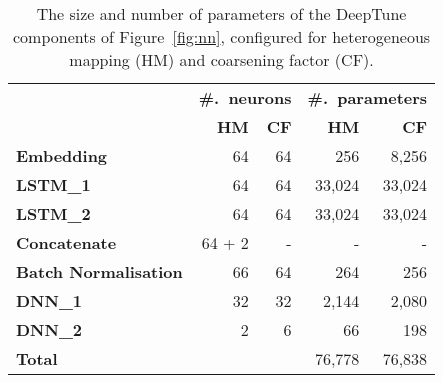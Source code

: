 \begin{table}
  \centering
  \begin{tabular}{| l r r | r r |}
    \hline
    \rowcolor{gray!50}
    & \multicolumn{2}{c}{\textbf{\#.\ neurons}} & \multicolumn{2}{c}{\textbf{\#.\ parameters}} \\
    \rowcolor{gray!50}
    & \textbf{HM} & \textbf{CF} & \textbf{HM} & \textbf{CF} \\
    \hline
    \textbf{Embedding} & 64 & 64 & 256 & 8,256 \\
    \textbf{LSTM\_1} & 64 & 64 & 33,024 & 33,024 \\
    \textbf{LSTM\_2} & 64 & 64 & 33,024 & 33,024 \\
    \textbf{Concatenate} & 64 + 2 & - & - & - \\
    \textbf{Batch Normalisation} & 66 & 64 & 264 & 256 \\
    \textbf{DNN\_1} & 32 & 32 & 2,144 & 2,080 \\
    \textbf{DNN\_2} & 2 & 6 & 66 & 198 \\
    \hline
    \textbf{Total} & & & 76,778 & 76,838 \\
    \hline
  \end{tabular}
  \caption[DeepTune model parameters]{%
    The size and number of parameters of the DeepTune components of
    Figure~\ref{fig:nn}, configured for heterogeneous mapping (HM) and
    coarsening factor (CF).%
  }
  \label{tab:nn-size}
\end{table}
